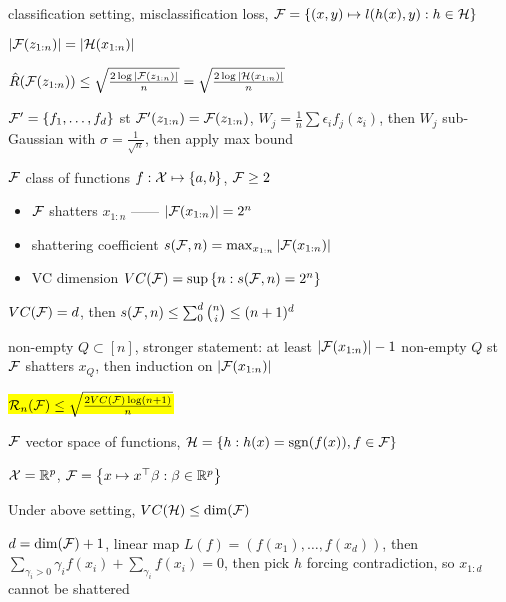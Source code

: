\begin{setting}
    classification setting, misclassification loss, $\mathcal{F} = \left\{ (x, y) \mapsto l(h(x), y) : h \in \mathcal{H}\right\}$
\end{setting}
\begin{fact}
    $|\mathcal{F}(z_{1:n})| = |\mathcal{H}(x_{1:n})|$
\end{fact}

\begin{lemma}
    $\hat R(\mathcal{F}(z_{1:n})) \leq \sqrt{\frac{2 \log |\mathcal{F}(z_{1:n})|}{n}} = \sqrt{\frac{2 \log |\mathcal{H}(x_{1:n})|}{n}}$
\end{lemma}
\begin{pf}
    $\mathcal{F}' = \left\{ f_1, \dots, f_d \right\}$ st $\mathcal{F}'(z_{1:n}) = \mathcal{F}(z_{1:n})$, $W_j = \frac{1}{n} \sum \epsilon_i f_j(z_i)$,
    then $W_j$ sub-Gaussian with $\sigma = \frac{1}{\sqrt{n}}$, then apply max bound
\end{pf}

\begin{setting}
    $\mathcal{F}$ class of functions $f : \mathcal{X} \mapsto \left\{ a, b \right\}$, $\mathcal{F} \geq 2$
\end{setting}

\begin{itemize}
    \item $\mathcal{F}$ shatters $x_{1:n}$ ------ $|\mathcal{F}(x_{1:n})| = 2^n$
    \item shattering coefficient $s(\mathcal{F}, n) = \max_{x_{1:n}} |\mathcal{F}(x_{1:n})|$
    \item VC dimension $VC(\mathcal{F}) = \sup \left\{ n : s(\mathcal{F}, n) = 2^n \right\}$
\end{itemize}

\begin{lemma}
    $VC(\mathcal{F}) = d$, then $s(\mathcal{F}, n) \leq \sum_0^d {n \choose i} \leq (n+1)^d$
\end{lemma}
\begin{pf}
    non-empty $Q \subset [n]$, stronger statement: at least $|\mathcal{F}(x_{1:n})| - 1$ non-empty $Q$ st $\mathcal{F}$ shatters $x_Q$,
    then induction on $|\mathcal{F}(x_{1:n})|$
\end{pf}

\begin{fact}
    \hl{$\mathcal{R}_n(\mathcal{F}) \leq \sqrt{\frac{2 VC(\mathcal{F}) \log(n+1)}{n}}$}
\end{fact}

\begin{setting}
    $\mathcal{F}$ vector space of functions, $\mathcal{H} = \left\{ h : h(x) = \textnormal{sgn}(f(x)), f\in \mathcal{F} \right\}$
\end{setting}
\begin{example}
    $\mathcal{X} = \mathbb{R}^p$, $\mathcal{F} = \left\{ x \mapsto x^\top \beta : \beta \in \mathbb{R}^p \right\}$
\end{example}

\begin{prop}
    Under above setting, $VC(\mathcal{H}) \leq \dim(\mathcal{F})$
\end{prop}
\begin{pf}
    $d= \dim(\mathcal{F}) + 1$, linear map $L(f) = (f(x_1), \dots, f(x_d))$, then $\sum_{\gamma_i > 0} \gamma_i f(x_i) + \sum_{\gamma_i} f(x_i) = 0$, then pick $h$ forcing
    contradiction, so $x_{1:d}$ cannot be shattered
\end{pf}



